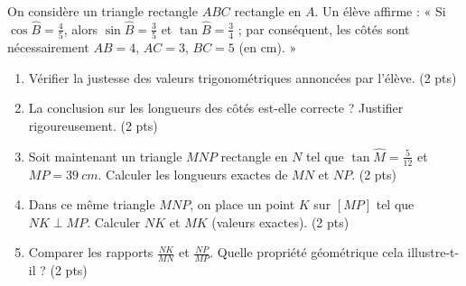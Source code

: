 \documentclass[11pt]{article}
\begin{document}
\begin{exercice}
On considère un triangle rectangle $ABC$ rectangle en $A$. Un élève affirme : « Si $\cos\widehat{B} = \frac{4}{5}$, alors $\sin\widehat{B} = \frac{3}{5}$ et $\tan\widehat{B} = \frac{3}{4}$ ; par conséquent, les côtés sont nécessairement $AB=4$, $AC=3$, $BC=5$ (en cm). »
\begin{enumerate}
    \item Vérifier la justesse des valeurs trigonométriques annoncées par l'élève. (2 pts)
    \item La conclusion sur les longueurs des côtés est-elle correcte ? Justifier rigoureusement. (2 pts)
    \item Soit maintenant un triangle $MNP$ rectangle en $N$ tel que $\tan\widehat{M} = \frac{5}{12}$ et $MP = \SI{39}{cm}$. Calculer les longueurs exactes de $MN$ et $NP$. (2 pts)
    \item Dans ce même triangle $MNP$, on place un point $K$ sur $[MP]$ tel que $NK \perp MP$. Calculer $NK$ et $MK$ (valeurs exactes). (2 pts)
    \item Comparer les rapports $\frac{NK}{MN}$ et $\frac{NP}{MP}$. Quelle propriété géométrique cela illustre-t-il ? (2 pts)
\end{enumerate}
\end{exercice}
\end{document}
